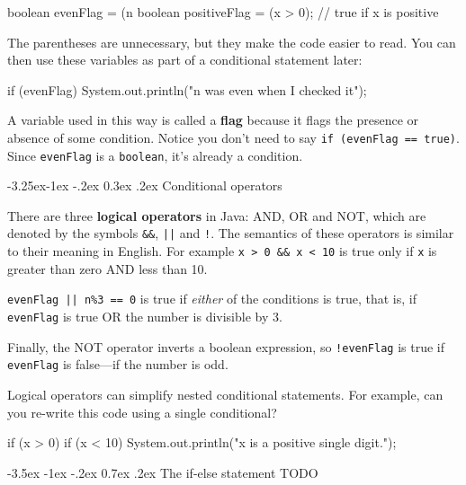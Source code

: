 \documentclass[12pt]{book}
\makeatletter
\renewcommand{\section}{\@startsection {section}{1}{\z@}%
    {-3.5ex \@plus -1ex \@minus -.2ex}%
    {0.7ex \@plus.2ex}%
    {\normalfont\Large\bfseries}}
\renewcommand\subsection{\@startsection{subsection}{2}{\z@}%
    {-3.25ex\@plus -1ex \@minus -.2ex}%
    {0.3ex \@plus .2ex}%
    {\normalfont\large\bfseries}}
\theoremstyle{exercise}
\newcommand{\java}[1]{\lstinline{#1}} %
\makeatother
\begin{document}
\begin{code}
    boolean evenFlag = (n %
    boolean positiveFlag = (x > 0);     // true if x is positive
\end{code}

The parentheses are unnecessary, but they make the code easier to read.
You can then use these variables as part of a conditional statement later:

\begin{code}
    if (evenFlag) {
        System.out.println("n was even when I checked it");
    }
\end{code}

A variable used in this way is called a {\bf flag} because it flags the presence or absence of some condition.
Notice you don't need to say \java{if (evenFlag == true)}.
Since \java{evenFlag} is a \java{boolean}, it's already a condition.

\subsection{Conditional operators}


There are three {\bf logical operators} in Java: AND, OR and NOT, which are denoted by the symbols {\tt \&\&}, {\tt ||} and {\tt !}.
The semantics of these operators is similar to their meaning in English.
For example {\tt x > 0 \&\& x < 10} is true only if {\tt x} is greater than zero AND less than 10.


{\tt evenFlag || n\%3 == 0} is true if {\em either} of the conditions is true, that is, if {\tt evenFlag} is true OR the number is divisible by 3.

Finally, the NOT operator inverts a boolean expression, so {\tt !evenFlag} is true if {\tt evenFlag} is false---if the number is odd.


Logical operators can simplify nested conditional statements.
For example, can you re-write this code using a single conditional?

\begin{code}
    if (x > 0) {
        if (x < 10) {
            System.out.println("x is a positive single digit.");
        }
    }
\end{code}


\section{The if-else statement}
TODO
\end{document}
